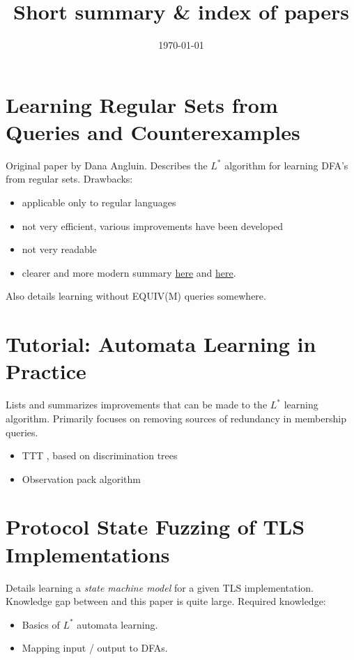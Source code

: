 \documentclass[11pt]{article}
\title{\textbf{Short summary \& index of papers}}
\author{}
\date{\today}
\begin{document}
\maketitle

\section{\cite{Angluin87} Learning Regular Sets from Queries and Counterexamples}
Original paper by Dana Angluin.
Describes the $L^*$ algorithm for learning DFA's from regular sets.
Drawbacks:
\begin{itemize}
  \item applicable only to regular languages
  \item not very efficient, various improvements have been developed
  \item not very readable
  \item clearer and more modern summary
        \href{https://www.cs.bgu.ac.il/~beimel/Courses/Learning/}{here} and
        \href{https://www.cs.bgu.ac.il/~beimel/Courses/Learning/lect3.ps}{here}.
\end{itemize}
Also details learning without EQUIV(M) queries somewhere.

\section{\cite{Howar14} Tutorial: Automata Learning in Practice}
Lists and summarizes improvements that can be made to the $L^*$ learning algorithm.
Primarily focuses on removing sources of redundancy in membership queries.
\begin{itemize}
  \item TTT \cite{Isberner14b}, based on discrimination trees\cite{Kearns94}
  \item Observation pack algorithm
\end{itemize}

\section{\cite{deRuiter15} Protocol State Fuzzing of TLS Implementations}
Details learning a \textit{state machine model} for a given TLS implementation.
Knowledge gap between \cite{Angluin87} and this paper is quite large.
Required knowledge:
\begin{itemize}
  \item \cite{Angluin87} Basics of $L^*$ automata learning.
  \item \cite{Steffen12} Mapping input / output to DFAs.
\end{itemize}
\end{document}
